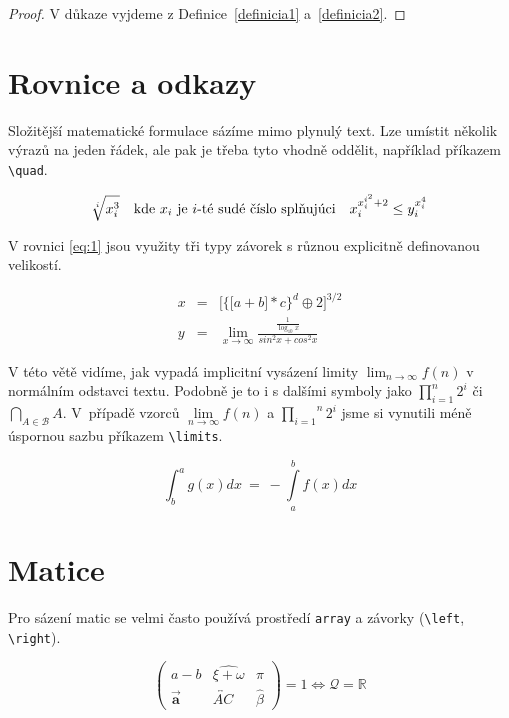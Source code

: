 \documentclass[a4paper, 11pt, twocolumn]{article}
\theoremstyle{definition}
\begin{document}
  \begin{proof}
    V důkaze vyjdeme z Definice~\ref{definicia1} a~\ref{definicia2}.
  \end{proof}

  \section{Rovnice a odkazy}

  Složitější matematické formulace sázíme mimo plynulý text.
  Lze umístit několik výrazů na jeden řádek, ale pak je třeba tyto vhodně oddělit, 
  například příkazem \verb|\quad|.
  
  $$
    \sqrt[i]{x_i^3} \text{\quad kde } x_i \text{ je } i\text{-té sudé číslo splňujúci\quad} x_i^{x_i^{i^2}+ 2} \leq y_i^{x_i^4}
  $$

  V rovnici \eqref{eq:1} jsou využity tři typy závorek s různou explicitně definovanou velikostí.
  
  \begin{eqnarray}
      \label{eq:1}
      x & = & \Bigg[\bigg\{\Big[a+b\Big]\ast c\bigg\}^d \oplus 2\Bigg]^{3/2}\\
      y & = & \lim\limits_{x \to \infty} \frac{\frac{1}{\log_{10} x}}{sin^2x+cos^2x} \nonumber
  \end{eqnarray}

  V této větě vidíme, jak vypadá implicitní vysázení limity $\lim_{n \to \infty} f(n)$ 
  v normálním odstavci textu. Podobně je to i s dalšími symboly jako $\prod_{i=1}^{n} 2^i$ či $\bigcap_{A\in \mathcal{B}}A$. 
  V~pří\-padě vzorců $\lim\limits_{n \to \infty} f(n)$ a $\overset{n}{\underset{i=1}\prod} 2^i$ 
  jsme si vynutili méně úspornou sazbu příkazem \verb|\limits|.

  \begin{equation}
    \int_{b}^{a} g(x)dx\ =\ - \int\limits_{a}^{b} f(x) dx
  \end{equation}

  \section{Matice}

  Pro sázení matic se velmi často používá prostředí \texttt{array} a závorky (\verb|\left|, \verb|\right|).

  \begin{equation*}
    \left(\!
      \begin{array}{ccc}
        a - b  & \widehat{\xi + \omega} & \pi \\[0.3em]
        \vec{\mathbf{a}} & \overleftrightarrow{AC} & \hat{\beta}
      \end{array}
    \!\right)= 1 \Longleftrightarrow \mathcal{Q} =\mathbb{R}
  \end{equation*}
\end{document}
